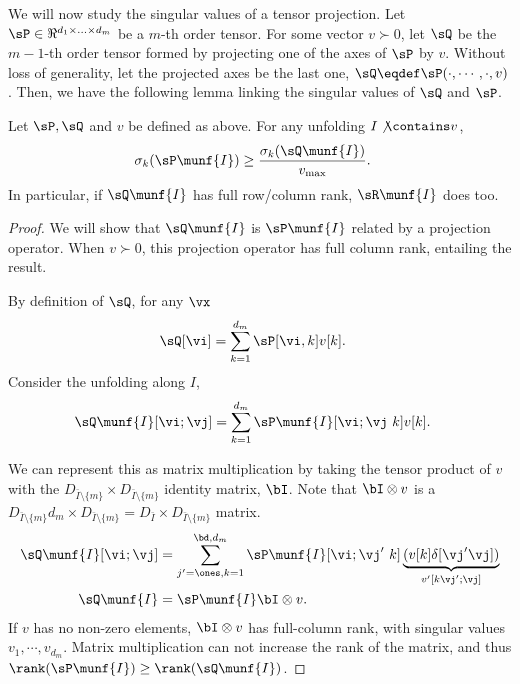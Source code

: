 We will now study the singular values of a tensor projection. 
Let $\sP \in \Re^{d_1 \times \ldots \times d_m}$ be a $m$-th order
  tensor. 
For some vector $v \succ 0$, let $\sQ$ be the $m-1$-th order tensor
  formed by projecting one of the axes of $\sP$ by $v$. 
Without loss of generality, let the projected axes be the last one, $\sQ
  \eqdef \sP(\cdot, \cdots, \cdot, v)$.
Then, we have the following lemma linking the singular values of $\sQ$
  and $\sP$.
\begin{lemma}
  \label{lem:tensor-projection}
  Let $\sP, \sQ$ and $v$ be defined as above. For any unfolding $I
  \not\contains v$, 
\begin{align*}
  \sigma_{k}(\sP\munf{I}) &\ge \frac{\sigma_{k}(\sQ\munf{I})}{v_{\max}}.
\end{align*}
In particular, if $\sQ\munf{I}$ has full row/column rank, $\sR\munf{I}$
  does too.
\end{lemma}
\begin{proof}
  We will show that $\sQ\munf{I}$ is $\sP\munf{I}$ related by
  a projection operator. When $v \succ 0$, this projection operator has
  full column rank, entailing the result.

  By definition of $\sQ$, for any $\vx$
  \begin{align*}
    \sQ[\vi] &= \sum_{k=1}^{d_m} \sP[\vi, k] v[k].
  \end{align*}
  Consider the unfolding along $I$,
  \begin{align*}
    \sQ\munf{I}[\vi;\vj] &= \sum_{k=1}^{d_m} \sP\munf{I}[\vi;\vj\ k] v[k].
  \end{align*}

  We can represent this as matrix multiplication by taking the tensor
  product of $v$ with the $D_{\bar I \setminus \{m\}} \times D_{\bar
  I \setminus \{m\}}$ identity matrix, $\bI$. Note that $\bI \otimes v$ is a $
  D_{\bar I \setminus \{m\}} d_m \times D_{\bar I \setminus \{m\}}
  = D_{\bar I } \times D_{\bar I \setminus \{m\}}$ matrix.
  \begin{align*}
    \sQ\munf{I}[\vi;\vj] 
    &= \sum_{j'=\ones, k=1}^{\bd, d_m} \sP\munf{I}[\vi;\vj'\ k] \underbrace{(v[k] \delta[\vj' \vj])}_{v'[k \vj'; \vj]} \\
    \sQ\munf{I}
      &= \sP\munf{I} \bI \otimes v.
  \end{align*}
  If $v$ has no non-zero elements, $\bI \otimes v$ has full-column
  rank, with singular values $v_1, \cdots, v_{d_m}$. 
  Matrix multiplication can not increase the rank of the matrix, and
  thus $\rank(\sP\munf{I}) \ge \rank(\sQ\munf{I})$. 


\end{proof}


